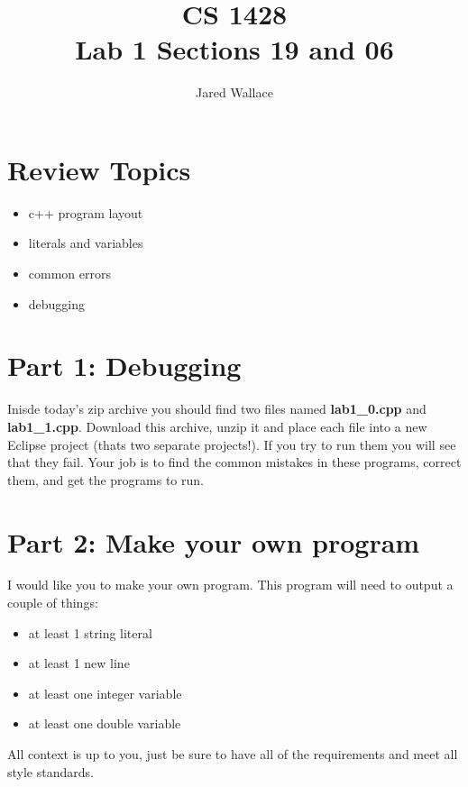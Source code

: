 \documentclass[letterpaper,12pt]{article}
\title{\Large CS 1428\\Lab 1 Sections 19 and 06}
\author{Jared Wallace}
\date{}
\begin{document}
\maketitle

\section*{Review Topics}
\begin{itemize}
  \item c++ program layout
  \item literals and variables
  \item common errors
  \item debugging
\end{itemize}

\section*{Part 1: Debugging}
Inisde today's zip archive you should find two files named \textbf{lab1\_0.cpp} and \textbf{lab1\_1.cpp}. Download this archive, unzip it and place each file into a new Eclipse project (thats two separate projects!). If you try to run them you will see that they fail. Your job is to find the common mistakes in these programs, correct them, and get the programs to run.

\section*{Part 2: Make your own program}
I would like you to make your own program. This program will need to output a couple of things:
\begin{itemize}
 \item at least 1 string literal
 \item at least 1 new line
 \item at least one integer variable
 \item at least one double variable
\end{itemize}
All context is up to you, just be sure to have all of the requirements and meet all style standards.
\end{document}
